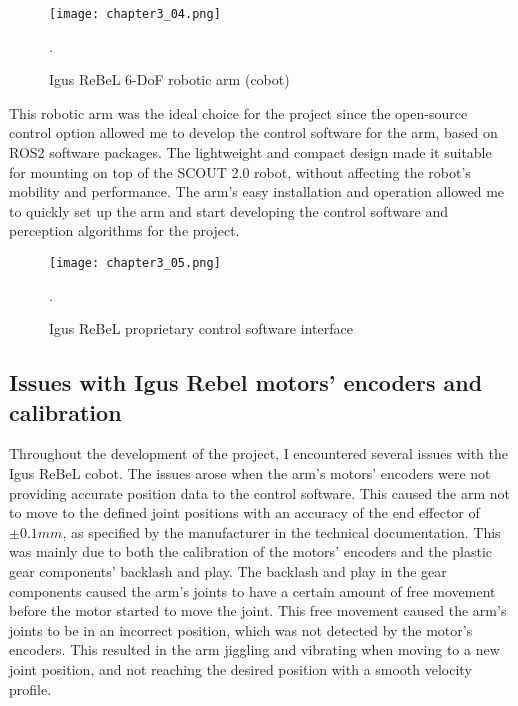 \begin{figure}[t]
    \centering
    \texttt{[image: chapter3\_04.png]}
    \captionsetup{width=1\linewidth}
    \caption{Igus ReBeL 6-DoF robotic arm (cobot)}.
    \label{fig:c3_img04}
\end{figure}

This robotic arm was the ideal choice for the project since the open-source control option allowed me to develop
the control software for the arm, based on ROS2 software packages. The lightweight and compact design made it suitable
for mounting on top of the SCOUT 2.0 robot, without affecting the robot's mobility and performance. 
The arm's easy installation and operation allowed me to quickly set up the arm and start developing the control software
and perception algorithms for the project.

\begin{figure}[t]
    \centering
    \texttt{[image: chapter3\_05.png]}
    \captionsetup{width=1\linewidth}
    \caption{Igus ReBeL proprietary control software interface}.
    \label{fig:c3_img05}
\end{figure}

\subsection*{Issues with Igus Rebel motors' encoders and calibration}

Throughout the development of the project, I encountered several issues with the Igus ReBeL cobot.
The issues arose when the arm's motors' encoders were not providing accurate position data to the control software.
This caused the arm not to move to the defined joint positions with an accuracy of the end effector of $\pm 0.1mm$,
as specified by the manufacturer in the technical documentation.
This was mainly due to both the calibration of the motors' encoders and the plastic gear components' backlash and play.
The backlash and play in the gear components caused the arm's joints to have a certain amount of free movement before the motor
started to move the joint. This free movement caused the arm's joints to be in an incorrect position, which was not detected
by the motor's encoders. This resulted in the arm jiggling and vibrating when moving to a new joint position, and not reaching
the desired position with a smooth velocity profile.

